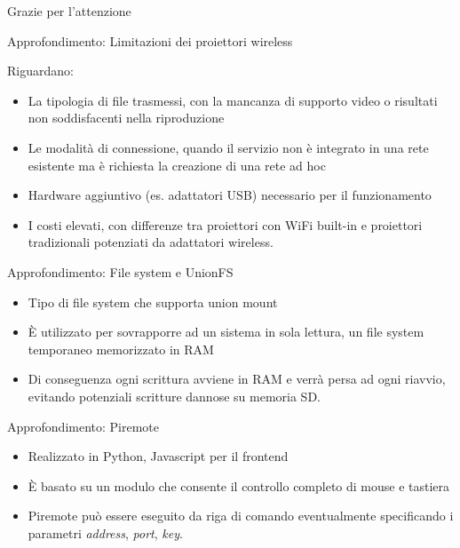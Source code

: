 \documentclass{beamer}
\begin{document}
\begin{frame}[c]

\begin{center}
\LARGE Grazie per l'attenzione
\end{center}
\end{frame}

\begin{frame}{Approfondimento: Limitazioni dei proiettori wireless}

Riguardano:\newline

\begin{itemize}

\item La tipologia di file trasmessi, con la mancanza di supporto video o risultati non soddisfacenti nella riproduzione
\item Le modalità di connessione, quando il servizio non è integrato in una rete esistente ma è richiesta la creazione di una rete ad hoc
\item Hardware aggiuntivo (es. adattatori USB) necessario per il funzionamento
\item I costi elevati, con differenze tra proiettori con WiFi built-in e proiettori tradizionali potenziati da adattatori wireless.

\end{itemize}
\end{frame}



\begin{frame}{Approfondimento: File system e UnionFS}

\begin{itemize}
\item Tipo di file system che supporta union mount
\item È utilizzato per sovrapporre ad un sistema in sola lettura, un file system temporaneo memorizzato in RAM
\item Di conseguenza ogni scrittura avviene in RAM e verrà persa ad ogni riavvio, evitando potenziali scritture dannose su memoria SD.
\end{itemize}
\end{frame}

\begin{frame}{Approfondimento: Piremote}

\begin{itemize}

\item Realizzato in Python, Javascript per il frontend
\item È basato su un modulo che consente il controllo completo di mouse e tastiera
\item Piremote può essere eseguito da riga di comando eventualmente specificando i parametri \textit{address}, \textit{port}, \textit{key}.

\end{itemize}

\end{frame}
\end{document}
